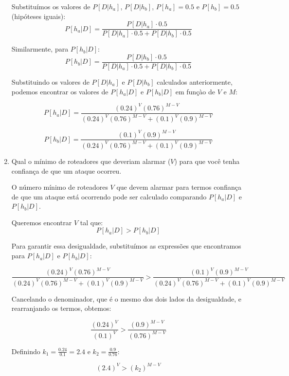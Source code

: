 \documentclass[12 pt]{article}
\begin{document}
\begin{enumerate}
\begin{tcolorbox}[colback=white, colframe=black, title=Resposta:]
    Substituímos os valores de \( P[D|h_a] \), \( P[D|h_b] \), \( P[h_a] = 0.5 \) e \( P[h_b] = 0.5 \) (hipóteses iguais):
    $$
    P[h_a|D] = \frac{P[D|h_a] \cdot 0.5}{P[D|h_a] \cdot 0.5 + P[D|h_b] \cdot 0.5}
    $$
    
    Similarmente, para \( P[h_b|D] \):
    $$
    P[h_b|D] = \frac{P[D|h_b] \cdot 0.5}{P[D|h_a] \cdot 0.5 + P[D|h_b] \cdot 0.5}
    $$

    Substituindo os valores de \( P[D|h_a] \) e \( P[D|h_b] \) calculados anteriormente, podemos encontrar os valores de \( P[h_a|D] \) e \( P[h_b|D] \) em funçào de \( V \) e \( M \):

    $$
P[h_a|D] = \frac{(0.24)^V (0.76)^{M - V}}{(0.24)^V (0.76)^{M - V} + (0.1)^V (0.9)^{M - V}}
$$

$$
P[h_b|D] = \frac{(0.1)^V (0.9)^{M - V}}{(0.24)^V (0.76)^{M - V} + (0.1)^V (0.9)^{M - V}}
$$
    
\end{tcolorbox}
\newpage

    \item Qual o mínimo de roteadores que deveriam alarmar ($V$) para que você tenha confiança de que um ataque ocorreu.
    
    \begin{tcolorbox}[colback=white, colframe=black, title=Resposta:]

    O número mínimo de roteadores \( V \) que devem alarmar para termos confiança de que um ataque está ocorrendo pode ser calculado comparando \( P[h_a|D] \) e \( P[h_b|D] \).
    
    Queremos encontrar \( V \) tal que:
    $$
    P[h_a|D] > P[h_b|D]
    $$
    
    Para garantir essa desigualdade, substituímos as expressões que encontramos para \( P[h_a|D] \) e \( P[h_b|D] \):

    $$
    \frac{(0.24)^V (0.76)^{M - V}}{(0.24)^V (0.76)^{M - V} + (0.1)^V (0.9)^{M - V}} > \frac{(0.1)^V (0.9)^{M - V}}{(0.24)^V (0.76)^{M - V} + (0.1)^V (0.9)^{M - V}}
    $$
    
    Cancelando o denominador, que é o mesmo dos dois lados da desigualdade, e rearranjando os termos, obtemos:
    
    $$
    \frac{(0.24)^V}{(0.1)^V} > \frac{(0.9)^{M - V}}{(0.76)^{M - V}}
    $$
    
    Definindo \( k_1 = \frac{0.24}{0.1} = 2.4 \) e \( k_2 = \frac{0.9}{0.76} \):
    
    $$
    (2.4)^V > (k_2)^{M - V}
    $$
    

\end{tcolorbox}
\end{enumerate}
\end{document}

